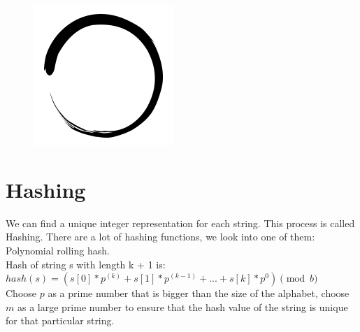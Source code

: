 \documentclass[12pt]{article}
\title{\vspace{-2em}\mytitle\vspace{-0.3em}}
\author{
        \textbf{Editor}\\
        Mehmet Altuner  \\ \ \\ 
        \textbf{Reviewer} \\ Osman Karaketir
    }
\date{}
\begin{document}
        
        \begin{figure}
            \centering
            \includegraphics[width=\linewidth/4]{inzva-logo.png}
            \label{fig:inzva}
        \end{figure}
        \maketitle
        
        \cleardoublepage
        \tableofcontents
        \cleardoublepage
        
        \section{Hashing}
        We can find a unique integer representation for each string. This process is called Hashing. There are a lot of hashing functions, we look into one of them: Polynomial rolling hash. \\
        
        Hash of string s with length k + 1 is: $hash(s) = (s[0] * p^{(k)}+ s[1] * p ^ {(k-1)} + ... + s[k] * p^0) \pmod{b}$ \\
    
        Choose $p$ as a prime number that is bigger than the size of the alphabet, choose $m$ as a large prime number to ensure that the hash value of the string is unique for that particular string.
        
\end{document}
